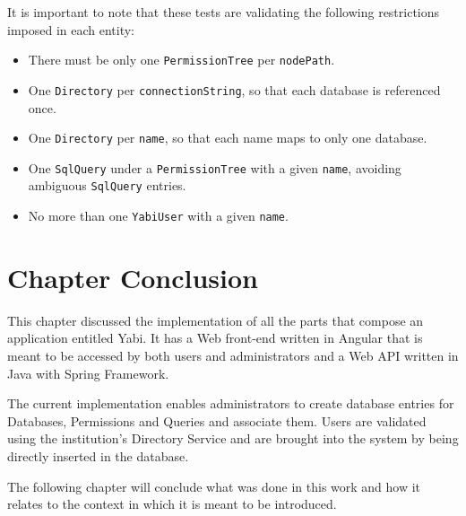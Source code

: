 It is important to note that these tests are validating the following restrictions imposed in each entity:
\begin{itemize}
\item There must be only one \texttt{PermissionTree} per \texttt{nodePath}.
\item One \texttt{Directory} per \texttt{connectionString}, so that each database is referenced once.
\item One \texttt{Directory} per \texttt{name}, so that each name maps to only one database.
\item One \texttt{SqlQuery} under a \texttt{PermissionTree} with a given \texttt{name}, avoiding ambiguous \texttt{SqlQuery} entries.
\item No more than one \texttt{YabiUser} with a given \texttt{name}.
\end{itemize}

\section{Chapter Conclusion}
This chapter discussed the implementation of all the parts that compose an application entitled \gls{Yabi}. It has a Web front-end written in Angular that is meant to be accessed by both users and administrators and a Web \gls{API} written in Java with Spring Framework.

The current implementation enables administrators to create database entries for Databases, Permissions and Queries and associate them. Users are validated using the institution's Directory Service and are brought into the system by being directly inserted in the database.

The following chapter will conclude what was done in this work and how it relates to the context in which it is meant to be introduced.